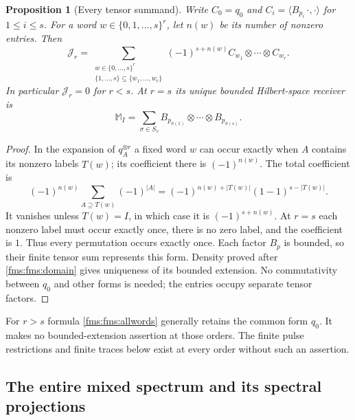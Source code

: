 \documentclass[11pt,a4paper]{article}
\newtheorem{proposition}[theorem]{Proposition}
\theoremstyle{definition}\newtheorem{definition}[theorem]{Definition}
\begin{document}
\begin{proposition}[Every tensor summand]\label{fms:fms:subset}
Write $C_0=q_0$ and
$C_i=\langle B_{p_i}\,\cdot,\cdot\rangle$ for $1\le i\le s$.
For a word $w\in\{0,1,\ldots,s\}^r$, let $n(w)$ be its number
of nonzero entries. Then
\begin{equation}\tag{FMS13}\label{fms:fms:allwords}
 \mathcal J_r=
 \sum_{\substack{w\in\{0,\ldots,s\}^r\\
                  \{1,\ldots,s\}\subseteq\{w_1,\ldots,w_r\}}}
       (-1)^{s+n(w)}C_{w_1}\otimes\cdots\otimes C_{w_r}.
\end{equation}
In particular $\mathcal J_r=0$ for $r<s$. At $r=s$ its unique
bounded Hilbert-space receiver is
\begin{equation}\tag{FMS14}\label{fms:fms:mixedoperator}
 \mathbb M_I=\sum_{\sigma\in S_s}
        B_{p_{\sigma(1)}}\otimes\cdots\otimes B_{p_{\sigma(s)}}.
\end{equation}
\end{proposition}
\begin{proof}
In the expansion of $q_A^{\otimes r}$ a fixed word $w$ can occur
exactly when $A$ contains its nonzero labels $T(w)$; its coefficient
there is $(-1)^{n(w)}$. The total coefficient is
\[
 (-1)^{n(w)}\sum_{A\supseteq T(w)}(-1)^{|A|}
 =(-1)^{n(w)+|T(w)|}(1-1)^{s-|T(w)|}.
\]
It vanishes unless $T(w)=I$, in which case it is
$(-1)^{s+n(w)}$.  At $r=s$ each nonzero label must occur exactly
once, there is no zero label, and the coefficient is $1$.
Thus every permutation occurs exactly once. Each factor $B_p$ is
bounded, so their finite tensor sum represents this form. Density
proved after \eqref{fms:fms:domain} gives uniqueness of its bounded
extension. No commutativity between $q_0$ and other forms is needed;
the entries occupy separate tensor factors.
\end{proof}

For $r>s$ formula \eqref{fms:fms:allwords} generally retains the common
form $q_0$. It makes no bounded-extension assertion at those orders.
The finite pulse restrictions and finite traces below exist at every
order without such an assertion.

\subsection{The entire mixed spectrum and its spectral projections}
\end{document}
